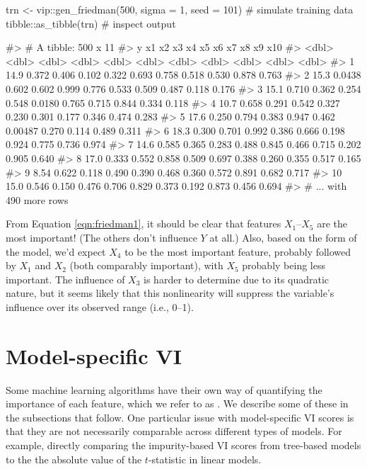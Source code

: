 \begin{Schunk}
\begin{Sinput}
trn <- vip::gen_friedman(500, sigma = 1, seed = 101)  # simulate training data
tibble::as_tibble(trn)  # inspect output
\end{Sinput}
\begin{Soutput}
#> # A tibble: 500 x 11
#>        y     x1    x2    x3    x4     x5      x6    x7    x8    x9   x10
#>    <dbl>  <dbl> <dbl> <dbl> <dbl>  <dbl>   <dbl> <dbl> <dbl> <dbl> <dbl>
#>  1 14.9  0.372  0.406 0.102 0.322 0.693  0.758   0.518 0.530 0.878 0.763
#>  2 15.3  0.0438 0.602 0.602 0.999 0.776  0.533   0.509 0.487 0.118 0.176
#>  3 15.1  0.710  0.362 0.254 0.548 0.0180 0.765   0.715 0.844 0.334 0.118
#>  4 10.7  0.658  0.291 0.542 0.327 0.230  0.301   0.177 0.346 0.474 0.283
#>  5 17.6  0.250  0.794 0.383 0.947 0.462  0.00487 0.270 0.114 0.489 0.311
#>  6 18.3  0.300  0.701 0.992 0.386 0.666  0.198   0.924 0.775 0.736 0.974
#>  7 14.6  0.585  0.365 0.283 0.488 0.845  0.466   0.715 0.202 0.905 0.640
#>  8 17.0  0.333  0.552 0.858 0.509 0.697  0.388   0.260 0.355 0.517 0.165
#>  9  8.54 0.622  0.118 0.490 0.390 0.468  0.360   0.572 0.891 0.682 0.717
#> 10 15.0  0.546  0.150 0.476 0.706 0.829  0.373   0.192 0.873 0.456 0.694
#> # ... with 490 more rows
\end{Soutput}
\end{Schunk}

From Equation \eqref{eqn:friedman1}, it should be clear that features
\(X_1\)--\(X_5\) are the most important! (The others don't influence
\(Y\) at all.) Also, based on the form of the model, we'd expect \(X_4\)
to be the most important feature, probably followed by \(X_1\) and
\(X_2\) (both comparably important), with \(X_5\) probably being less
important. The influence of \(X_3\) is harder to determine due to its
quadratic nature, but it seems likely that this nonlinearity will
suppress the variable's influence over its observed range (i.e., 0--1).

\section{Model-specific VI}

Some machine learning algorithms have their own way of quantifying the
importance of each feature, which we refer to as
. We describe some of these in the subsections
that follow. One particular issue with model-specific VI scores is that
they are not necessarily comparable across different types of models.
For example, directly comparing the impurity-based VI scores from
tree-based models to the the absolute value of the \(t\)-statistic in
linear models.

